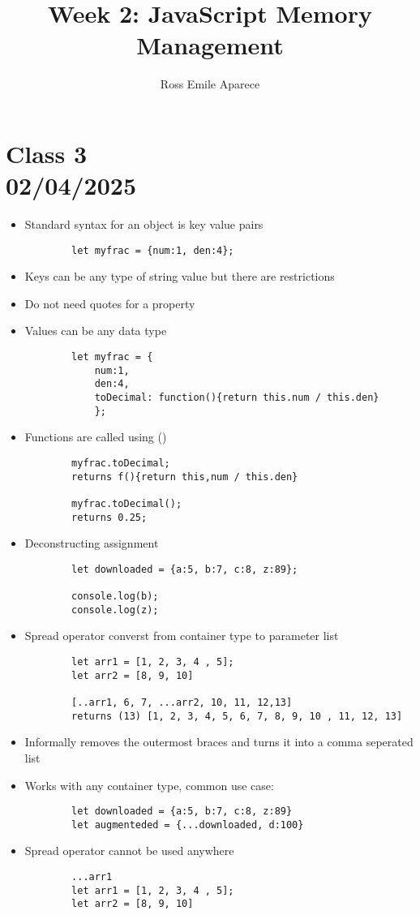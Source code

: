 \documentclass{article}
\title{Week 2: JavaScript Memory Management}
\date{}
\author{Ross Emile Aparece}
\begin{document}
\maketitle

\section*{Class 3 \\ 02/04/2025}\label{sec:Class 3}
\begin{itemize}
    \item Standard syntax for an object is key value pairs
    \begin{lstlisting}
        let myfrac = {num:1, den:4};
    \end{lstlisting}
    \item Keys can be any type of string value but there are restrictions
    \item Do not need quotes for a property
    \item Values can be any data type
    \begin{lstlisting}
        let myfrac = {
            num:1, 
            den:4, 
            toDecimal: function(){return this.num / this.den}
            };
    \end{lstlisting}
    \item Functions are called using ()
    \begin{lstlisting}
        myfrac.toDecimal;
        returns f(){return this,num / this.den}

        myfrac.toDecimal();
        returns 0.25;
    \end{lstlisting}
    \item Deconstructing assignment
    \begin{lstlisting}
        let downloaded = {a:5, b:7, c:8, z:89};

        console.log(b);
        console.log(z);
    \end{lstlisting}
    \item Spread operator converst from container type to parameter list
    \begin{lstlisting}
        let arr1 = [1, 2, 3, 4 , 5];
        let arr2 = [8, 9, 10]

        [..arr1, 6, 7, ...arr2, 10, 11, 12,13]
        returns (13) [1, 2, 3, 4, 5, 6, 7, 8, 9, 10 , 11, 12, 13]
    \end{lstlisting}
    \item Informally removes the outermost braces and turns it into a comma seperated list
    \item Works with any container type, common use case:
    \begin{lstlisting}
        let downloaded = {a:5, b:7, c:8, z:89}
        let augmenteded = {...downloaded, d:100}
    \end{lstlisting}
    \item Spread operator cannot be used anywhere
    \begin{lstlisting}
        ...arr1 
        let arr1 = [1, 2, 3, 4 , 5];
        let arr2 = [8, 9, 10]


\end{lstlisting}
\end{itemize}
\end{document}
